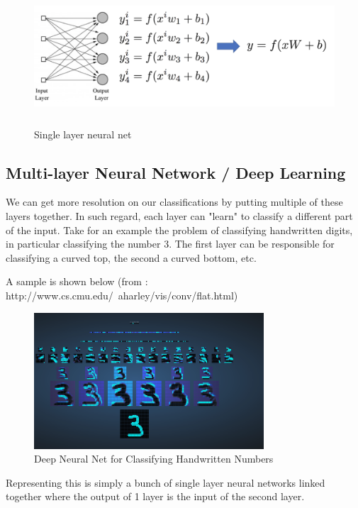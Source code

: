 \documentclass[twoside]{article}
\begin{document}
\begin{figure}[!htb]
\centering
\includegraphics[height = 2in]{pics/Logistic_regression.png}
\caption{Single layer neural net\cite{Lecture slides}}
\label{fig:Single layer neural net}
\end{figure}


\subsection{Multi-layer Neural Network / Deep Learning}

We can get more resolution on our classifications by putting multiple of these layers together. In such regard, each layer can "learn" to classify a different part of the input. Take for an example the problem of classifying handwritten digits, in particular classifying the number 3. The first layer can be responsible for classifying a curved top, the second a curved bottom, etc.

A sample is shown below (from : http://www.cs.cmu.edu/~aharley/vis/conv/flat.html)

\begin{figure}[!htb]
\centering
\includegraphics[height = 2in]{pics/deep_neural_net.png}
\caption{Deep Neural Net for Classifying Handwritten Numbers\cite{}}
\label{fig:Single layer neural net}
\end{figure}

Representing this is simply a bunch of single layer neural networks linked together where the output of 1 layer is the input of the second layer.
\end{document}

